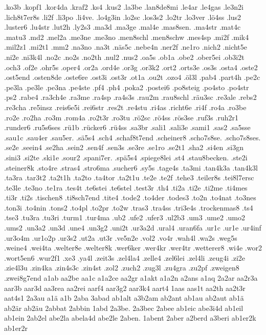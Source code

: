 {.ko3b
.kopf1
.kor4da
.kraf2
.ks4
.kus2
.la3be
.lan8de8mi
.le4ar
.le4gas
.le3n2i
.lich8t7er8s
.li2f
.li3po
.li4ve.
.lo4g3in
.lo2sc
.los3s2
.lo2tr
.lo3ver
.lö4ss
.lus2
.luster6
.lu4str
.lut2h
.ly2s3
.ma3d
.ma3ge
.mal4e
.mas8sen.
.ma4str
.mat4c
.matu3
.md2
.mel2a
.me3ne
.me3no
.men8schl
.men8schw
.mes4sp
.mi2f
.mik4
.mil2z1
.mi2t1
.mm2
.na3no
.na3t
.näs5c
.nebe4n
.ner2f
.ne1ro
.nich2
.nicht5e
.ni2e
.ni3k4l
.no2c
.no2s
.no2th
.nul2
.nus2
.oa5s
.ob1a
.obe2
.ober5ei
.ob3i2t
.och3
.of2e
.ohr5s
.oper4
.or2a
.ord4e
.or3g
.or3k2
.ort2
.orts3e
.os3s
.osta4
.oste2
.ost5end
.osten8de
.oste6re
.ost3i
.ost3r
.ot1a
.ou2t
.ozo4
.öl3l
.pab4
.part4h
.pe2c
.pe3la
.pe3le
.pe3na
.pe4ste
.pf4
.ph4
.poka2
.postei6
.po8steig
.po4sto
.po4str
.ps2
.rabe4
.ra3ch4e
.ra3me
.ra4sp
.ra4s3s
.rau2m
.rau8schl
.räu3sc
.re3ale
.rebs2
.re3cha
.re5insz
.reis6e5i
.rei6str
.res2t
.re4stu
.ri4as
.richt6e
.ri4f
.ro4a
.ro3be
.ro2e
.ro2ha
.ro3m
.rom4a
.ro2t3r
.ro3tu
.rö2sc
.rö4ss
.rös3se
.ruf3s
.ruh2r1
.runder6
.ru5s6ses
.rü1b
.rücker6
.rü4ss
.sa3br
.sali1
.sali3e
.sami1
.sas2
.sa5sse
.sau1c
.sau4er
.sau5er.
.sä5s4
.sch4
.schaf8t7end
.scheiner8
.scho7s8se.
.scho7s8ses.
.se2e
.seein4
.se2ha
.sein2
.sen4f
.sen3s
.se3re
.se1ro
.se2t1
.sha2
.si4en
.si3gn
.sini3
.si2te
.ski1e
.sour2
.spani7er.
.spä5s4
.spiege8lei
.st4
.stau8becken.
.ste2i
.steiner8k
.sto4re
.stras4
.stro6ma
.sucher6
.sy5s
.tage4s
.ta3mi
.tan4k3a
.tan4k3l
.ta3ra
.tar3t2
.ta2t1h
.ta2to
.ta4tor
.ta2t1u
.te2e
.te2f
.tehe3
.teiler8s
.tei8l7ersc
.te3le
.te3no
.te1ra
.tes4t
.te6stei
.te6stel
.test3r
.th4
.ti2a
.ti2e
.ti2me
.ti4mes
.ti3r
.ti2s
.tischen8
.ti8sch7end
.tite4
.tode2
.to4der
.todes3
.to2n
.to4nat
.to3nes
.ton3i
.to4nin
.tons2
.to4pl
.to2pr
.to2w
.tras3
.tra4ss
.tri3e4s
.trockenmas8
.ts4
.tse3
.tu3ra
.tu3ri
.turm1
.tur4ma
.ub2
.ufe2
.ufer3
.ul2b3
.um3
.ume2
.umo2
.ums2
.un3a2
.un3d
.une4
.un3g2
.uni2t
.ur3a2d
.ural4
.uran6fa
.ur1c
.ur1e
.ur4inf
.ur3o4m
.ur1o2p
.ur3s2
.ut2a
.ut3r
.ve5n2e
.vol2
.vo4r
.wah4l
.wa2s
.weg5s
.weine4
.wei4ta
.welter8e
.welter8k
.wer6ker
.wer4kr
.wer4tr
.wetterer8
.wi4e
.wor2
.wort5en6
.wur2f1
.xe3
.ya4l
.zeit3s
.zel4la4
.zelle4
.zel6lei
.zel4li
.zeug4i
.zi2e
.zie4l3u
.zin4ka
.zin4s3c
.zin4st
.zol2
.zuch2
.zug3l
.zu4gra
.zu2pf
.zweigen8
.zwei8g7end
a1ab
aa2be
aa1c
a1a2ce
aa2gr
a1akt
a1a2n
a2ans
a1aq
2a2ar
aa2r3a
aar3b
aar3d
aa3rea
aa2rei
aarf4
aar3g2
aar3k4
aart4
1aas
aas1t
aa2th
aa2t3r
aat4s1
2a3au
a1ä
a1b
2aba
3abad
ab1alt
a3b2am
ab2ant
ab1au
ab2aut
ab1ä
ab2är
ab2äu
2abbat
2abbin
1abd
2a3be.
2a3bec
2abee
ab1eic
abe3i4d
ab1eil
ab1ein
2ab2el
abe2la
abela4d
abe2le
2aben.
1abent
2aber
a2berd
a3beri
ab1er2k
ab1er2r
}
